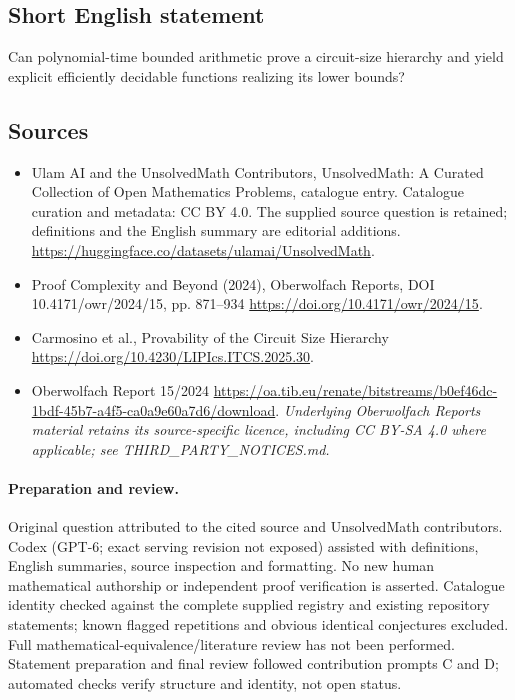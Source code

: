 \documentclass[11pt]{article}
\begin{document}
\subsection{Short English statement}
Can polynomial-time bounded arithmetic prove a circuit-size hierarchy and yield explicit efficiently decidable functions realizing its lower bounds?
\subsection{Sources}
\begin{itemize}
\item[\hypertarget{source:statement:1}{S1}] Ulam AI and the UnsolvedMath Contributors, UnsolvedMath: A Curated Collection of Open Mathematics Problems, catalogue entry. Catalogue curation and metadata: CC BY 4.0. The supplied source question is retained; definitions and the English summary are editorial additions.
\url{https://huggingface.co/datasets/ulamai/UnsolvedMath}.
\item[\hypertarget{source:statement:2}{S2}] Proof Complexity and Beyond (2024), Oberwolfach Reports, DOI 10.4171/owr/2024/15, pp. 871--934
\url{https://doi.org/10.4171/owr/2024/15}.
\item[\hypertarget{source:statement:3}{S3}] Carmosino et al., Provability of the Circuit Size Hierarchy
\url{https://doi.org/10.4230/LIPIcs.ITCS.2025.30}.
\item[\hypertarget{source:statement:4}{S4}] Oberwolfach Report 15/2024
\url{https://oa.tib.eu/renate/bitstreams/b0ef46dc-1bdf-45b7-a4f5-ca0a9e60a7d6/download}.
\textit{Underlying Oberwolfach Reports material retains its source-specific licence, including CC BY-SA 4.0 where applicable; see THIRD\_PARTY\_NOTICES.md.}
\end{itemize}
\paragraph{Preparation and review.}
Original question attributed to the cited source and UnsolvedMath contributors. Codex (GPT-6; exact serving revision not exposed) assisted with definitions, English summaries, source inspection and formatting. No new human mathematical authorship or independent proof verification is asserted. Catalogue identity checked against the complete supplied registry and existing repository statements; known flagged repetitions and obvious identical conjectures excluded. Full mathematical-equivalence/literature review has not been performed. Statement preparation and final review followed contribution prompts C and D; automated checks verify structure and identity, not open status.
\label{end:statement}
\end{document}
